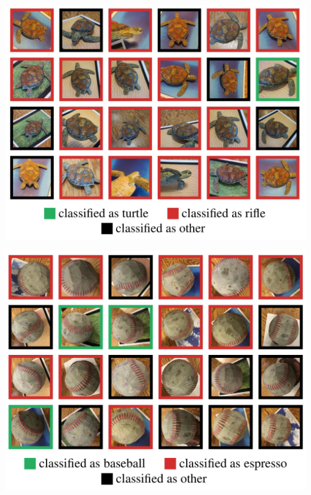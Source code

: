 \documentclass[aspectratio=43,x11names]{beamer}
\begin{document}
\begin{frame}
\begin{center}
\includegraphics[width=\textwidth]{images/turtle_class} 
\end{center}
\end{frame}

\begin{frame}
\begin{center}
\includegraphics[width=\textwidth]{images/baseball_class} 
\end{center}
\end{frame}
\end{document}
